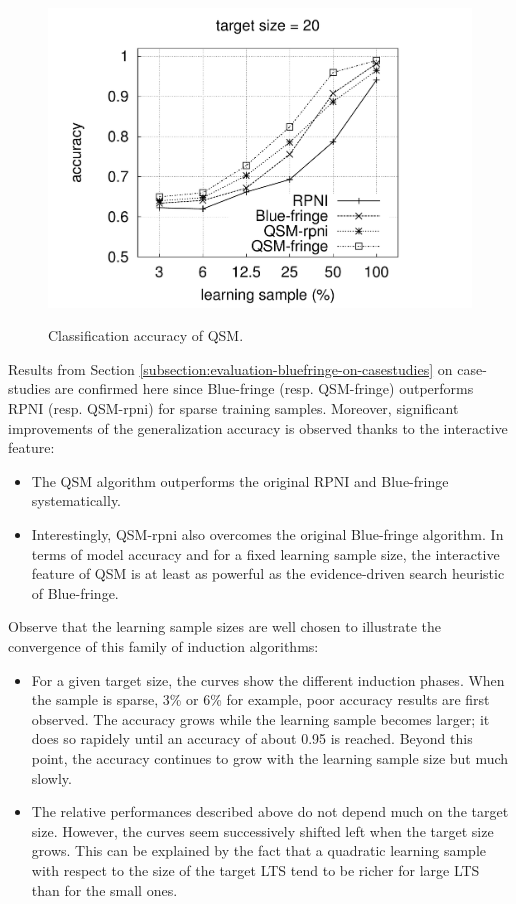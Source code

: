 \begin{figure}[t]
{  \includegraphics[trim=30mm 0mm 35mm 0mm, clip, page=4]{src/5-evaluation/images/accuracy}
}
\caption{Classification accuracy of QSM\label{image:evaluation-qsm-accuracy}.}
\end{figure}

Results from Section \ref{subsection:evaluation-bluefringe-on-casestudies} on case-studies are confirmed here since Blue-fringe (resp. QSM-fringe) outperforms RPNI (resp. QSM-rpni) for sparse training samples. Moreover, significant improvements of the generalization accuracy is observed thanks to the interactive feature:
\begin{itemize}
\item The QSM algorithm outperforms the original RPNI and Blue-fringe systematically.
\item Interestingly, QSM-rpni also overcomes the original Blue-fringe algorithm. In terms of model accuracy and for a fixed learning sample size, the interactive feature of QSM is at least as powerful as the evidence-driven search heuristic of Blue-fringe.
\end{itemize}

Observe that the learning sample sizes are well chosen to illustrate the convergence of this family of induction algorithms:
\begin{itemize}
\item For a given target size, the curves show the different induction phases. When the sample is sparse, 3\% or 6\% for example, poor accuracy results are first observed. The accuracy grows while the learning sample becomes larger; it does so rapidely until an accuracy of about 0.95 is reached. Beyond this point, the accuracy continues to grow with the learning sample size but much slowly. 
\item The relative performances described above do not depend much on the target size. However, the curves seem successively shifted left when the target size grows. This can be explained by the fact that a quadratic learning sample with respect to the size of the target LTS tend to be richer for large LTS than for the small ones. 
\end{itemize}

